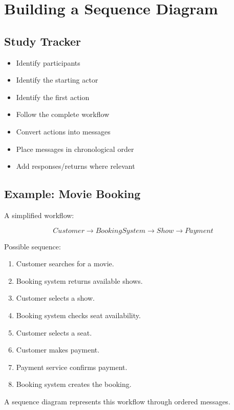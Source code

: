 \documentclass[11pt,a4paper]{article}
\newcommand{\checkitem}{$\square$}
\begin{document}
\section{Building a Sequence Diagram}

\subsection{Study Tracker}

\begin{itemize}[label=\checkitem]
    \item Identify participants
    \item Identify the starting actor
    \item Identify the first action
    \item Follow the complete workflow
    \item Convert actions into messages
    \item Place messages in chronological order
    \item Add responses/returns where relevant
\end{itemize}

\subsection{Example: Movie Booking}

A simplified workflow:

\[
Customer
\rightarrow
BookingSystem
\rightarrow
Show
\rightarrow
Payment
\]

Possible sequence:

\begin{enumerate}
    \item Customer searches for a movie.
    \item Booking system returns available shows.
    \item Customer selects a show.
    \item Booking system checks seat availability.
    \item Customer selects a seat.
    \item Customer makes payment.
    \item Payment service confirms payment.
    \item Booking system creates the booking.
\end{enumerate}

A sequence diagram represents this workflow through ordered messages.
\end{document}
